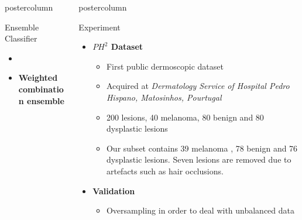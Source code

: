 \documentclass[final]{beamer}
\newlength{\columnheight}
\begin{document}
\begin{frame}
\begin{columns}
\begin{column}{.49\textwidth}
\begin{beamercolorbox}[center,wd=\textwidth]{postercolumn}
\begin{minipage}[T]{.95\textwidth}
{\begin{block}{Ensemble Classifier}
\begin{itemize}
\begin{columns}
\begin{column}{.44\textwidth}
            		\end{column}
            \end{columns}
            \item[]
            	\item \textbf{\color{orounam} Weighted combination ensemble}
            \end{itemize}
            \end{block}          
            \vfill
         
          }
        \end{minipage}
      \end{beamercolorbox}
    \end{column}
	\begin{column}{.49\textwidth}
	\begin{beamercolorbox}[center,wd=\textwidth]{postercolumn}
        \begin{minipage}[T]{.95\textwidth}  %
          \parbox[t][\columnheight]{\textwidth}{ %
            \begin{block}{Experiment}
            	 \begin{itemize}
            		\item \textbf{\color{orounam} $PH^{2}$ Dataset}
            		\begin{itemize}
            		 \item First public dermoscopic dataset
            		 \item Acquired at \textit{Dermatology Service of Hospital Pedro Hispano, Matosinhos, Pourtugal}
            		 \item 200 lesions, 40 melanoma, 80 benign and 80 dysplastic lesions 
            		 \item Our subset contains 39 melanoma , 78 benign and 76 dysplastic lesions. Seven lesions are removed due to artefacts such as hair occlusions.
            		\end{itemize}
            		\item \textbf{\color{orounam} Validation}
            		\begin{itemize}
            		 \item Oversampling in order to deal with unbalanced data 

\end{itemize}
\end{itemize}
\end{block}}
\end{minipage}
\end{beamercolorbox}
\end{column}
\end{columns}
\end{frame}
\end{document}
